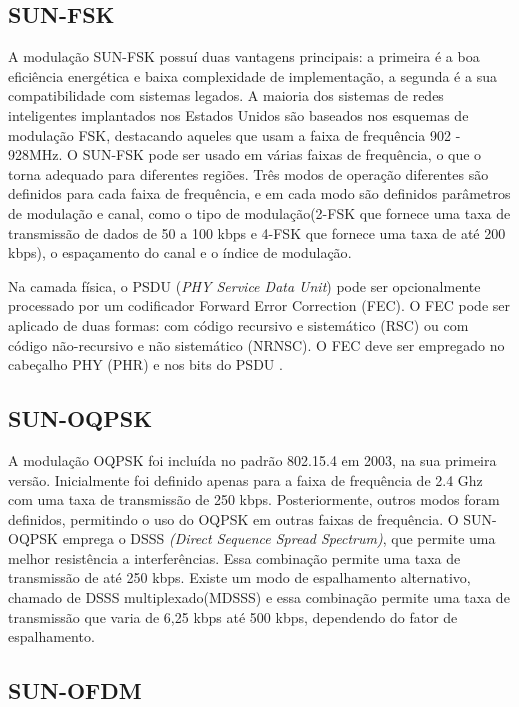 \subsection{SUN-FSK}
\label{subsec:sun-fsk}

A modulação SUN-FSK possuí duas vantagens principais: a primeira é a boa eficiência energética e baixa complexidade de implementação, a segunda é a sua compatibilidade com sistemas legados. A maioria dos sistemas de redes inteligentes implantados 
nos Estados Unidos são baseados nos esquemas de modulação FSK, destacando aqueles que usam a faixa de frequência 902 - 928MHz. 
O SUN-FSK pode ser usado em várias faixas de frequência, o que o torna adequado para diferentes regiões. Três modos de operação diferentes são definidos para cada faixa de frequência, e em cada modo são definidos parâmetros de modulação e canal, 
como o tipo de modulação(2-FSK que fornece uma taxa de transmissão de dados de 50 a 100 kbps e 4-FSK que fornece uma taxa de até 200 kbps), 
o espaçamento do canal e o índice de modulação\cite{tuset2020evaluating}.

Na camada física, o PSDU (\textit{PHY Service Data Unit}) pode ser opcionalmente processado por um codificador Forward Error Correction (FEC).
O FEC pode ser aplicado de duas formas: com código recursivo e sistemático (RSC) ou com código não-recursivo e não sistemático (NRNSC). 
O FEC deve ser empregado no cabeçalho PHY (PHR) e nos bits do PSDU \cite{tuset2020evaluating}.
 
\subsection{SUN-OQPSK}
\label{subsec:sun-oqpsk}

A modulação OQPSK foi incluída no padrão 802.15.4 em 2003, na sua primeira versão. Inicialmente foi definido apenas para a faixa de frequência
de 2.4 Ghz com uma taxa de transmissão de 250 kbps. Posteriormente, outros modos foram definidos, permitindo o uso do OQPSK em outras faixas de
frequência. O SUN-OQPSK emprega o DSSS \textit{(Direct Sequence Spread Spectrum)}, que permite uma melhor resistência a interferências. Essa combinação permite uma taxa de transmissão de até 250 kbps. Existe um modo de espalhamento alternativo, chamado de DSSS multiplexado(MDSSS) e essa combinação permite uma taxa de transmissão que varia de 6,25 kbps até 500 kbps, dependendo do fator de espalhamento\cite{gomes2020improving}.

\subsection{SUN-OFDM}
\label{subsec:sun-ofdm}

